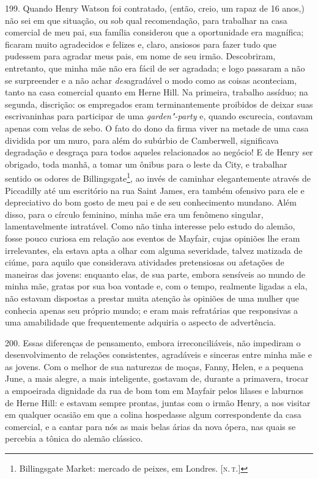 199. Quando Henry Watson foi contratado, (então, creio, um rapaz de 16
anos,) não sei em que situação, ou sob qual recomendação, para trabalhar
na casa comercial de meu pai, sua família considerou que a oportunidade
era magnífica; ficaram muito agradecidos e felizes e, claro, ansiosos
para fazer tudo que pudessem para agradar meus pais, em nome de seu
irmão. Descobriram, entretanto, que minha mãe não era fácil de ser
agradada; e logo passaram a não se surpreender e a não achar
\emph{des}agradável o modo como as coisas aconteciam, tanto na casa
comercial quanto em Herne Hill. Na primeira, trabalho assíduo; na
segunda, discrição: os empregados eram terminantemente proibidos de
deixar suas escrivaninhas para participar de uma \emph{garden"-party} e,
quando escurecia, contavam apenas com velas de sebo. O fato do dono da
firma viver na metade de uma casa dividida por um muro, para além do
subúrbio de Camberwell, significava degradação e desgraça para todos
aqueles relacionados ao negócio! E de Henry ser obrigado, toda manhã, a
tomar um ônibus para o leste da City, e trabalhar sentido os odores de
Billingsgate\footnote{Billingsgate Market: mercado de peixes, em Londres.
  {[}\textsc{n.\,t.}{]}}, ao invés de caminhar elegantemente através de
Piccadilly até um escritório na rua Saint James, era também ofensivo
para ele e depreciativo do bom gosto de meu pai e de seu conhecimento
mundano. Além disso, para o círculo feminino, minha mãe era um fenômeno
singular, lamentavelmente intratável. Como não tinha interesse pelo
estudo do alemão, fosse pouco curiosa em relação aos eventos de Mayfair,
cujas opiniões lhe eram irrelevantes, ela estava apta a olhar com alguma
severidade, talvez matizada de ciúme, para aquilo que considerava
atividades pretensiosas ou afetações de maneiras das jovens: enquanto
elas, de sua parte, embora sensíveis ao mundo de minha mãe, gratas por
sua boa vontade e, com o tempo, realmente ligadas a ela, não estavam
dispostas a prestar muita atenção às opiniões de uma mulher que conhecia
apenas seu próprio mundo; e eram mais refratárias que responsivas a uma
amabilidade que frequentemente adquiria o aspecto de advertência.

200. Essas diferenças de pensamento, embora irreconciliáveis, não
impediram o desenvolvimento de relações consistentes, agradáveis e
sinceras entre minha mãe e as jovens. Com o melhor de sua naturezas de
moças, Fanny, Helen, e a pequena June, a mais alegre, a mais
inteligente, gostavam de, durante a primavera, trocar a empoeirada
dignidade da rua de bom tom em Mayfair pelos lilases e laburnos de Herne
Hill: e estavam sempre prontas, juntas com o irmão Henry, a nos visitar
em qualquer ocasião em que a colina hospedasse algum correspondente da
casa comercial, e a cantar para nós as mais belas árias da nova ópera,
nas quais se percebia a tônica do alemão clássico.


